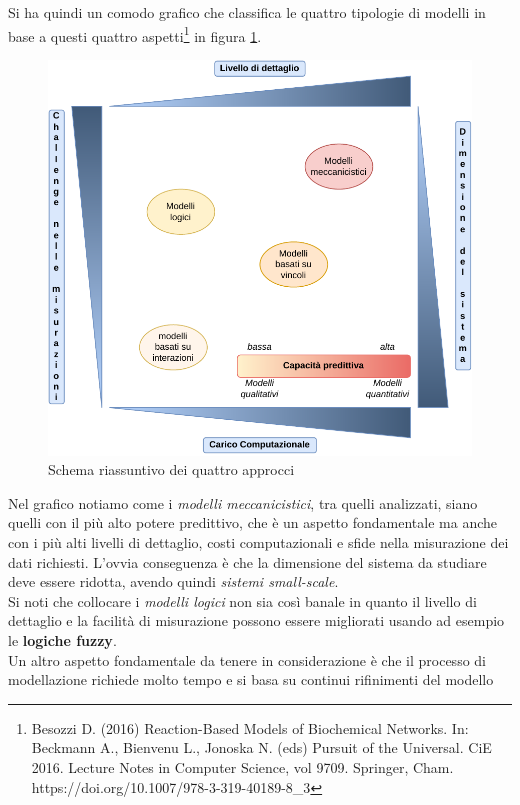\documentclass[a4paper,12pt, oneside]{book}
\begin{document}
Si ha quindi un comodo grafico che classifica le quattro tipologie di modelli
in base a questi quattro aspetti\footnote{Besozzi D. (2016) Reaction-Based
  Models of Biochemical Networks. In: Beckmann A., Bienvenu L., Jonoska N. (eds)
  Pursuit of the Universal. CiE 2016. Lecture Notes in Computer Science, vol
  9709. Springer, Cham. https://doi.org/10.1007/978-3-319-40189-8\_3} in figura
\ref{fig:appro}. 
\begin{figure}
  \centering
  \includegraphics[width = \textwidth]{img/choice.pdf}
  \caption{Schema riassuntivo dei quattro approcci}
  \label{fig:appro}
\end{figure}
Nel grafico notiamo come i \textit{modelli meccanicistici}, tra quelli
analizzati, siano 
quelli con il più alto potere predittivo, che è un aspetto fondamentale ma anche
con i più alti livelli di 
dettaglio, costi computazionali e sfide nella misurazione dei dati
richiesti. L'ovvia conseguenza è che la dimensione del sistema da studiare deve
essere ridotta, avendo quindi \textit{sistemi small-scale}.\\
Si noti che collocare i \textit{modelli logici} non sia così banale in quanto il
livello di dettaglio e la facilità di misurazione possono essere migliorati
usando ad esempio le \textbf{logiche fuzzy}.\\
Un altro aspetto fondamentale da tenere in considerazione è che il processo di
modellazione richiede molto tempo e si basa su continui rifinimenti del modello
\end{document}
